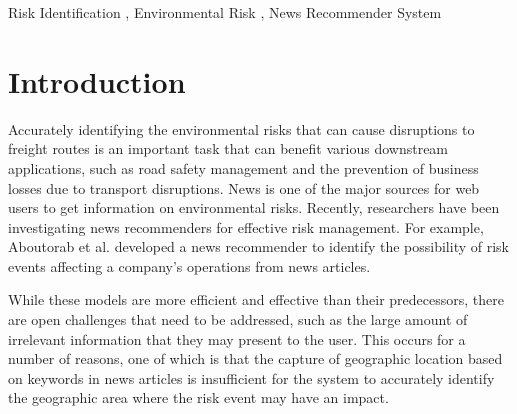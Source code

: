 \documentclass[
]{ceurart}
\begin{document}
\begin{keywords}
  Risk Identification \sep
  Environmental Risk \sep
  News Recommender System 
\end{keywords}

\maketitle
\section{Introduction}\label{1}
Accurately identifying the environmental risks that can cause disruptions to freight routes is an important task that can benefit various downstream applications, such as road safety management and the prevention of business losses due to transport disruptions. 
News is one of the major sources for web users to get information on environmental risks. 
Recently, researchers have been investigating news recommenders for effective risk management. For example, Aboutorab et al. \cite{aboutorab2021reinforcement} developed a news recommender to identify the possibility of risk events affecting a company's operations from news articles.

 While these models are more efficient and effective than their predecessors, there are open challenges that need to be addressed, such as the large amount of irrelevant information that they may present to the user. This occurs for a number of reasons, one of which is that the capture of geographic location based on keywords in news articles is insufficient for the system to accurately identify the geographic area where the risk event may have an impact. 
\end{document}
